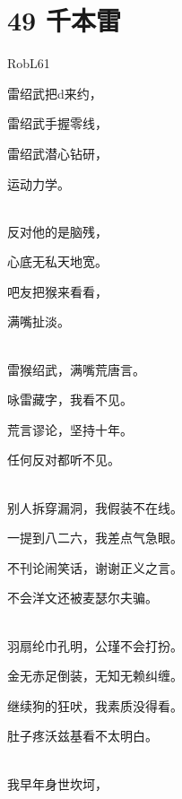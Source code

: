 \documentclass[UTF8,12pt,oneside]{ctexbook}
\begin{document}
        \newpage
        
        \section{49 千本雷}
        \begin{center}
            RobL61
        \end{center}
        
        \begin{center}
            雷绍武把d来约，
            
            雷绍武手握零线，
            
            雷绍武潜心钻研，
            
            运动力学。
            
            ~\\
            反对他的是脑残，
            
            心底无私天地宽。
            
            吧友把猴来看看，
            
            满嘴扯淡。
            
            ~\\
            雷猴绍武，满嘴荒唐言。
            
            咏雷藏字，我看不见。
            
            荒言谬论，坚持十年。
            
            任何反对都听不见。
            
            ~\\
            别人拆穿漏洞，我假装不在线。
            
            一提到八二六，我差点气急眼。
            
            不刊论闹笑话，谢谢正义之言。
            
            不会洋文还被麦瑟尔夫骗。
            
            ~\\
            羽扇纶巾孔明，公瑾不会打扮。
            
            金无赤足倒装，无知无赖纠缠。
            
            继续狗的狂吠，我素质没得看。
            
            肚子疼沃兹基看不太明白。
            
            ~\\
            我早年身世坎坷，
            

\end{center}
\end{document}
